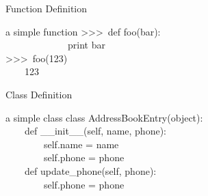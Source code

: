 \documentclass{beamer}
\begin{document}
  \begin{frame}{Function Definition}
     
    \begin{block}{a simple function}
      \scriptsize
      \textgreater\textgreater\textgreater \ def foo(bar):\\
      \ \ \ \ \ \ \ \ \ \ \ \ \ print bar\\
      \textgreater\textgreater\textgreater \ foo(123)\\
      \ \ \ \ 123
    \end{block}

  \end{frame}
  
  \begin{frame}{Class Definition}
    
    \begin{block}{a simple class}
      \scriptsize
      class AddressBookEntry(object):\\
      \ \ \ \ def \_\_init\_\_(self, name, phone):\\
      \ \ \ \ \ \ \ \ self.name = name\\
      \ \ \ \ \ \ \ \ self.phone = phone\\

      \ \ \ \ def update\_phone(self, phone):\\
      \ \ \ \ \ \ \ \ self.phone = phone\\
    \end{block}

  \end{frame}
\end{document}
